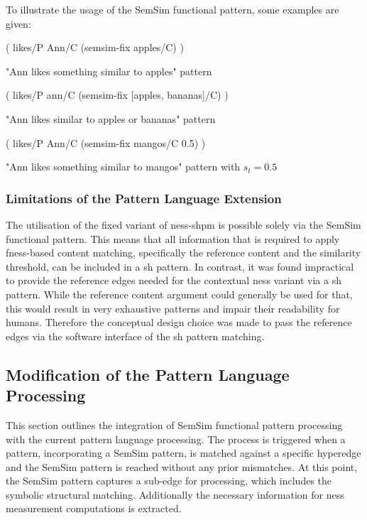 \documentclass[11pt]{scrreprt}
\begin{document}
To illustrate the usage of the SemSim functional pattern, some examples are given:

\begin{pattern}[h!]
  \normalfont\sffamily
  \centering
  ( likes/P Ann/C (semsim-fix apples/C) )
  \caption{"Ann likes something similar to apples" pattern}
  \label{pat:ann-likes-semsim-aplles}
\end{pattern}

\begin{pattern}[h!]
  \normalfont\sffamily
  \centering
  ( likes/P ann/C (semsim-fix [apples, bananas]/C) )
  \caption{"Ann likes similar to apples or bananas" pattern}
  \label{pat:ann-likes-apples-and-bananas}
\end{pattern}


\begin{pattern}[h!]
  \normalfont\sffamily
  \centering
  ( likes/P Ann/C (semsim-fix mangos/C 0.5) )
  \caption{"Ann likes something similar to mangos" pattern with \(s_t = 0.5\)}
  \label{pat:ann-likes-semsim-aplles}
\end{pattern}


\subsubsection{Limitations of the Pattern Language Extension}
\label{sec:pl-extension-limitations}
The utilisation of the fixed variant of \gls{ness-shpm} is possible solely via the SemSim functional pattern. This means that all information that is required to apply \gls{fness}-based content matching, specifically the reference content and the similarity threshold, can be included in a \gls{sh} pattern. In contrast, it was found impractical to provide the reference edges needed for the contextual \gls{ness} variant via a \gls{sh} pattern. While the reference content argument could generally be used for that, this would result in very exhaustive patterns and impair their readability for humans. Therefore the conceptual design choice was made to pass the reference edges via the software interface of the \gls{sh} pattern matching.


\subsection{Modification of the Pattern Language Processing}
\label{sec:modifications-pattern-language-processing}
This section outlines the integration of SemSim functional pattern processing with the current pattern language processing. The process is triggered when a pattern, incorporating a SemSim pattern, is matched against a specific hyperedge and the SemSim pattern is reached without any prior mismatches. At this point, the SemSim pattern captures a sub-edge for processing, which includes the symbolic structural matching. 
Additionally the necessary information for \gls{ness} measurement computations is extracted.
\end{document}
